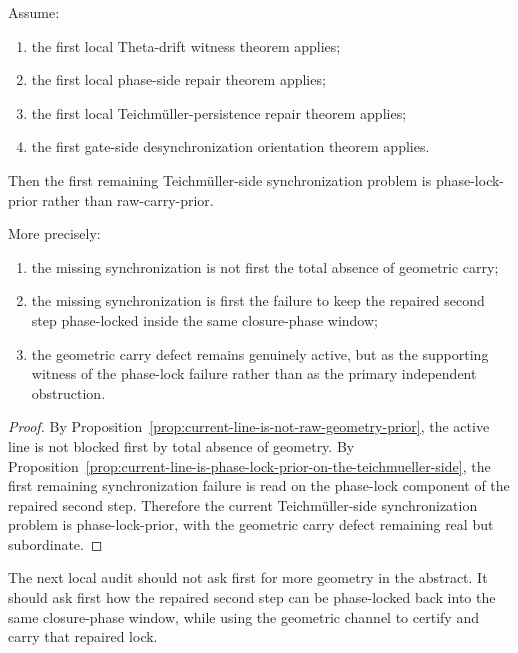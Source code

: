 \begin{theorem}
\label{thm:first-teichmueller-side-synchronization-orientation-theorem}
Assume:
\begin{enumerate}[leftmargin=2em,label=(\alph*)]
 \item the first local Theta-drift witness theorem applies;
 \item the first local phase-side repair theorem applies;
 \item the first local Teichm\"uller-persistence repair theorem applies;
 \item the first gate-side desynchronization orientation theorem applies.
\end{enumerate}
Then the first remaining Teichm\"uller-side synchronization problem is phase-lock-prior rather than raw-carry-prior.

More precisely:
\begin{enumerate}[leftmargin=2em,label=(\roman*)]
 \item the missing synchronization is not first the total absence of geometric carry;
 \item the missing synchronization is first the failure to keep the repaired second step phase-locked inside the same closure-phase window;
 \item the geometric carry defect remains genuinely active, but as the supporting witness of the phase-lock failure rather than as the primary independent obstruction.
\end{enumerate}
\end{theorem}

\begin{proof}
By Proposition~\ref{prop:current-line-is-not-raw-geometry-prior}, the active line is not blocked first by total absence of geometry. By Proposition~\ref{prop:current-line-is-phase-lock-prior-on-the-teichmueller-side}, the first remaining synchronization failure is read on the phase-lock component of the repaired second step. Therefore the current Teichm\"uller-side synchronization problem is phase-lock-prior, with the geometric carry defect remaining real but subordinate.
\end{proof}

\begin{corollary}
\label{cor:current-teichmueller-side-synchronization-working-rule}
The next local audit should not ask first for more geometry in the abstract. It should ask first how the repaired second step can be phase-locked back into the same closure-phase window, while using the geometric channel to certify and carry that repaired lock.
\end{corollary}

